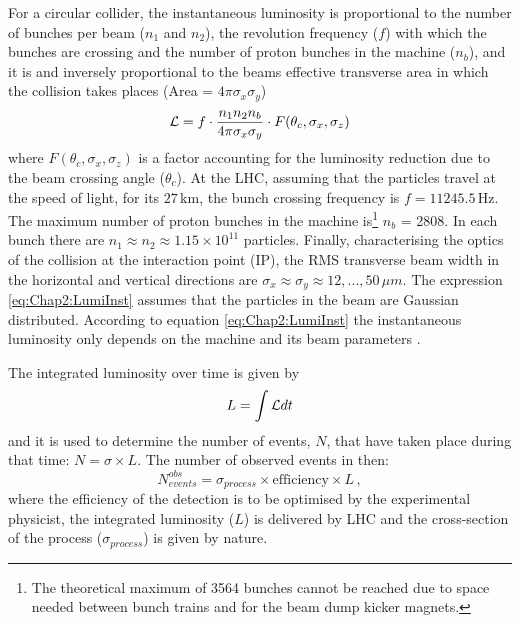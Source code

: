 
For a circular collider, the instantaneous luminosity is proportional  to the number of bunches per beam ($n_1$ and $n_2$), the revolution frequency ($f$) with 
which the bunches are crossing and the number of proton bunches in the machine ($n_b$), and it is and inversely proportional to the beams effective transverse area in which the collision takes places (Area = $4 \pi\sigma_{x} \sigma_{y}$) 
\begin{equation}\label{eq:Chap2:LumiInst}
\mathcal{L} = f \cdot \frac{n_{1} n_{2} n_{b}}{4 \pi\sigma_{x} \sigma_{y}}\cdot F(\theta_{c},\sigma_{x},\sigma_{z})
\end{equation}
where $F(\theta_{c},\sigma_{x},\sigma_{z})$ is a factor accounting for the luminosity reduction due to the beam crossing angle ($\theta_c$).
At  the LHC, assuming that the particles travel at the speed of light, for its $27\,$km, the bunch crossing frequency is $f = 11245.5\,$Hz. 
The maximum number of proton bunches in the machine is\footnote{The theoretical maximum of 3564 bunches cannot 
be reached due to space needed between bunch trains and for the beam dump kicker magnets.} $n_b$ = 2808. 
 In each bunch there are $n_1 \approx n_2 \approx 1.15 \times 10^{11}$ particles. Finally, characterising the optics of the collision at the interaction point (IP), the RMS transverse beam width in the horizontal and vertical directions are $\sigma_{x} \approx \sigma_{y} \approx 12, ... , 50\,\mu m$. The expression \ref{eq:Chap2:LumiInst} assumes that the particles in the beam are Gaussian distributed.
According to equation \ref{eq:Chap2:LumiInst} the instantaneous luminosity only depends on the machine and its beam parameters \cite{Hoecker:2016vvy}\cite{ATLAS:2016fhk}. 
     

The integrated luminosity over time is given by 
\begin{equation}
	 L = \int \mathcal{L} dt
 \end{equation}
 and it is used to determine the number of events, $N$, that have taken place during that time: $N = \sigma \times L$. 
 The number of observed events in then:
 \begin{equation}
	N^{obs}_{events} = \sigma_{process} \times \textrm{efficiency} \times L \, ,
 \end{equation}
where the efficiency of the detection is to be optimised by the experimental physicist, the integrated luminosity ($L$) is delivered by LHC and the cross-section of the 
process ($\sigma_{process}$) is given by nature.


